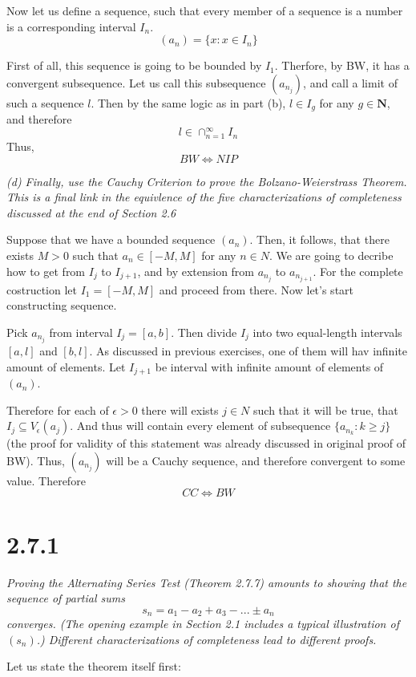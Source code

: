 \documentclass[11pt,oneside,titlepage]{article}
\begin{document}
Now let us define a sequence, such that every member of a sequence is
a number is a corresponding interval $I_n$.
$$(a_n) = \{x: x \in I_n\}$$

First of all, this sequence is going to be bounded by $I_1$. Therfore, by
BW, it has a convergent subsequence. Let us call this subsequence $(a_{n_j})$,
and call a limit of such a sequence $l$. Then by the same logic as in part (b),
$l \in I_g$ for any $g \in \textbf{N}$, and therefore
$$l \in \cap_{n = 1}^{\infty}I_n$$
Thus,
$$BW \iff NIP$$

\textit{(d) Finally, use the Cauchy Criterion to prove the Bolzano-Weierstrass
  Theorem. This is a final link in the equivlence of the five characterizations
  of completeness discussed at the end of Section 2.6}

Suppose that we have a bounded sequence $(a_n)$. Then, it follows, that
there exists $M > 0$ such that $a_n \in [-M, M]$ for any $n \in N$.
We are going to decribe how to get from $I_j$ to $I_{j + 1}$, and
by extension from $a_{n_j}$ to $a_{n_{j + 1}}$. For the complete costruction
let $I_1 = [-M, M]$ and proceed from there.
Now let's start constructing sequence.

Pick $a_{n_{j}} $ from interval $I_j = [a, b]$. Then divide $I_j$ into two
equal-length intervals $[a, l]$ and $[b, l]$. As discussed in previous
exercises, one of them will hav infinite amount of elements. Let $I_{j + 1}$
be interval with infinite amount of elements of $(a_n)$.

Therefore for each of $\epsilon > 0$ there will exists $j \in N$ such that
it will be true, that $I_j \subseteq V_\epsilon(a_j)$. And thus will contain
every  element of subsequence $\{a_{n_k}: k \geq j\}$ (the proof for validity
of this statement was already discussed in original proof of BW). Thus,
$(a_{n_j})$ will be a Cauchy sequence, and therefore convergent to some
value. Therefore
$$CC \iff BW$$

\section*{2.7.1}
\textit{Proving the Alternating Series Test (Theorem 2.7.7) amounts to
  showing that the sequence of partial sums }
$$s_n  = a_1 - a_2 + a_3 - ... \pm a_n$$
\textit{converges. (The opening example in Section 2.1 includes a
  typical illustration of $(s_n)$.) Different characterizations of
  completeness lead to different proofs.}

Let us state the theorem itself first:
\end{document}

